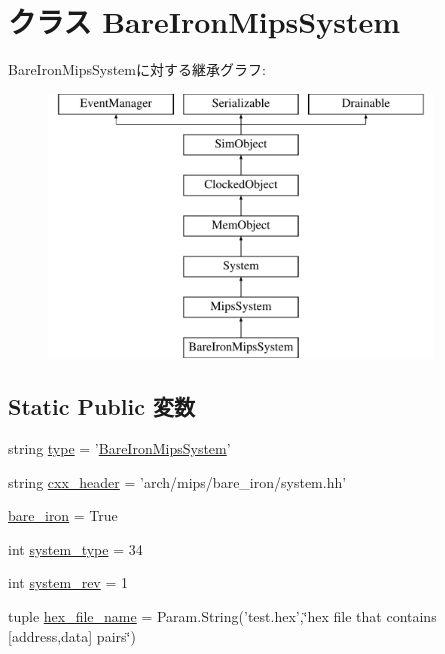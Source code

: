 \hypertarget{classMipsSystem_1_1BareIronMipsSystem}{
\section{クラス BareIronMipsSystem}
\label{classMipsSystem_1_1BareIronMipsSystem}
}
BareIronMipsSystemに対する継承グラフ:\begin{figure}[H]
\begin{center}
\leavevmode
\includegraphics[height=7cm]{classMipsSystem_1_1BareIronMipsSystem}
\end{center}
\end{figure}
\subsection*{Static Public 変数}
\begin{DoxyCompactItemize}
\item 
string \hyperlink{classMipsSystem_1_1BareIronMipsSystem_acce15679d830831b0bbe8ebc2a60b2ca}{type} = '\hyperlink{classMipsSystem_1_1BareIronMipsSystem}{BareIronMipsSystem}'
\item 
string \hyperlink{classMipsSystem_1_1BareIronMipsSystem_a17da7064bc5c518791f0c891eff05fda}{cxx\_\-header} = 'arch/mips/bare\_\-iron/system.hh'
\item 
\hyperlink{classMipsSystem_1_1BareIronMipsSystem_a600ac10fe4fa7eb6168fcdf31a513b95}{bare\_\-iron} = True
\item 
int \hyperlink{classMipsSystem_1_1BareIronMipsSystem_acfe3506cfe10e05a2cb2c2973dc5dad2}{system\_\-type} = 34
\item 
int \hyperlink{classMipsSystem_1_1BareIronMipsSystem_a261e4081ddd1f0823eccc0f042086c27}{system\_\-rev} = 1
\item 
tuple \hyperlink{classMipsSystem_1_1BareIronMipsSystem_a646616e47eba70e20cb5c35443d7bf4a}{hex\_\-file\_\-name} = Param.String('test.hex',\char`\"{}hex file that contains \mbox{[}address,data\mbox{]} pairs\char`\"{})
\end{DoxyCompactItemize}


